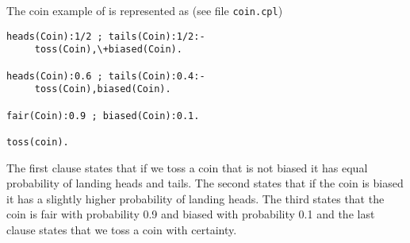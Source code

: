 \documentclass[a4paper,12pt]{article}
\begin{document}
The coin example of  \cite{VenVer04-ICLP04-IC} is represented as (see file \texttt{coin.cpl})
\begin{verbatim}
heads(Coin):1/2 ; tails(Coin):1/2:- 
     toss(Coin),\+biased(Coin).

heads(Coin):0.6 ; tails(Coin):0.4:- 
     toss(Coin),biased(Coin).

fair(Coin):0.9 ; biased(Coin):0.1.

toss(coin).
\end{verbatim}
The first clause states that if we toss a coin that is not biased it has equal probability of landing heads and tails. The second states that if the coin is biased it has a slightly higher probability of landing heads. The third states that the coin is fair with probability 0.9 and biased with probability 0.1 and the last clause states that we toss a coin with certainty.
\end{document}
